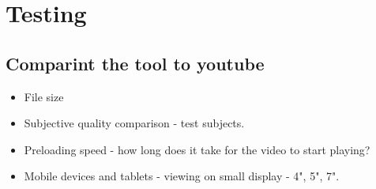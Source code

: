 \chapter{Testing}

\section{Comparint the tool to youtube}
\begin{itemize}
	\item File size
	\item Subjective quality comparison - test subjects.
	\item Preloading speed - how long does it take for the video to start playing?
	\item Mobile devices and tablets - viewing on small display - 4", 5", 7".
\end{itemize}